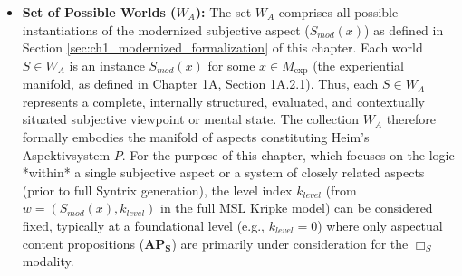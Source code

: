 \documentclass[
    12pt,              %
    a4paper,           %
    headings=normal,   %
    twoside=true,      %
    BCOR=8mm,          %
]{scrbook}
\newcommand{\aspektivsystem}{P}
\newcommand{\BoxS}{\Box_S}
\newcommand{\Mexp}{M_{\text{exp}}}
\newcommand{\APS}{\mathbf{AP_S}}
\begin{document}
\begin{itemize}
    \item   \textbf{Set of Possible Worlds (\(W_A\)):} The set \(W_A\) comprises all possible instantiations of the modernized subjective aspect (\(S_{mod}(x)\)) as defined in Section \ref{sec:ch1_modernized_formalization} of this chapter. Each world \(S \in W_A\) is an instance \(S_{mod}(x)\) for some \(x \in \Mexp\) (the experiential manifold, as defined in Chapter 1A, Section 1A.2.1). Thus, each \(S \in W_A\) represents a complete, internally structured, evaluated, and contextually situated subjective viewpoint or mental state. The collection \(W_A\) therefore formally embodies the manifold of aspects constituting Heim’s Aspektivsystem \(\aspektivsystem\). For the purpose of this chapter, which focuses on the logic *within* a single subjective aspect or a system of closely related aspects (prior to full Syntrix generation), the level index \(k_{level}\) (from \(w = (S_{mod}(x), k_{level})\) in the full MSL Kripke model) can be considered fixed, typically at a foundational level (e.g., \(k_{level}=0\)) where only aspectual content propositions (\(\APS\)) are primarily under consideration for the \(\BoxS\) modality.


\end{itemize}
\end{document}
